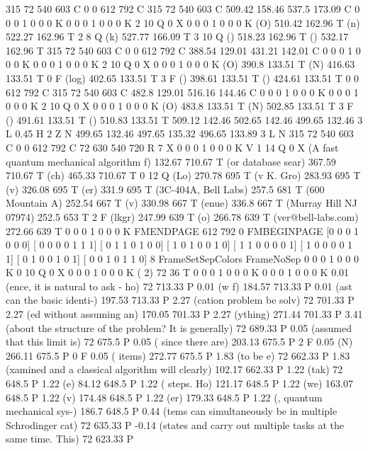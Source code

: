 315 72 540 603 C
0 0 612 792 C
315 72 540 603 C
509.42 158.46 537.5 173.09 C
0 0 0 1 0 0 0 K
0 0 0 1 0 0 0 K
2 10 Q
0 X
0 0 0 1 0 0 0 K
(O) 510.42 162.96 T
(n) 522.27 162.96 T
2 8 Q
(k) 527.77 166.09 T
3 10 Q
() 518.23 162.96 T
() 532.17 162.96 T
315 72 540 603 C
0 0 612 792 C
388.54 129.01 431.21 142.01 C
0 0 0 1 0 0 0 K
0 0 0 1 0 0 0 K
2 10 Q
0 X
0 0 0 1 0 0 0 K
(O) 390.8 133.51 T
(N) 416.63 133.51 T
0 F
(log) 402.65 133.51 T
3 F
() 398.61 133.51 T
() 424.61 133.51 T
0 0 612 792 C
315 72 540 603 C
482.8 129.01 516.16 144.46 C
0 0 0 1 0 0 0 K
0 0 0 1 0 0 0 K
2 10 Q
0 X
0 0 0 1 0 0 0 K
(O) 483.8 133.51 T
(N) 502.85 133.51 T
3 F
() 491.61 133.51 T
() 510.83 133.51 T
509.12 142.46 502.65 142.46 499.65 132.46 3 L
0.45 H
2 Z
N
499.65 132.46 497.65 135.32 496.65 133.89 3 L
N
315 72 540 603 C
0 0 612 792 C
72 630 540 720 R
7 X
0 0 0 1 0 0 0 K
V
1 14 Q
0 X
(A fast quantum mechanical algorithm f) 132.67 710.67 T
(or database sear) 367.59 710.67 T
(ch) 465.33 710.67 T
0 12 Q
(Lo) 270.78 695 T
(v K. Gro) 283.93 695 T
(v) 326.08 695 T
(er) 331.9 695 T
(3C-404A, Bell Labs) 257.5 681 T
(600 Mountain A) 252.54 667 T
(v) 330.98 667 T
(enue) 336.8 667 T
(Murray Hill NJ 07974) 252.5 653 T
2 F
(lkgr) 247.99 639 T
(o) 266.78 639 T
(ver@bell-labs.com) 272.66 639 T
0 0 0 1 0 0 0 K
FMENDPAGE
612 792 0 FMBEGINPAGE
[0 0 0 1 0 0 0]
[ 0 0 0 0 1 1 1]
[ 0 1 1 0 1 0 0]
[ 1 0 1 0 0 1 0]
[ 1 1 0 0 0 0 1]
[ 1 0 0 0 0 1 1]
[ 0 1 0 0 1 0 1]
[ 0 0 1 0 1 1 0]
 8 FrameSetSepColors
FrameNoSep
0 0 0 1 0 0 0 K
0 10 Q
0 X
0 0 0 1 0 0 0 K
(                                                                                        2) 72 36 T
0 0 0 1 0 0 0 K
0 0 0 1 0 0 0 K
0.01 (ence, it is natural to ask - ho) 72 713.33 P
0.01 (w f) 184.57 713.33 P
0.01 (ast can the basic identi-) 197.53 713.33 P
2.27 (cation problem be solv) 72 701.33 P
2.27 (ed without assuming an) 170.05 701.33 P
2.27 (ything) 271.44 701.33 P
3.41 (about the structure of the problem? It is generally) 72 689.33 P
0.05 (assumed that this limit is) 72 675.5 P
0.05 ( since there are) 203.13 675.5 P
2 F
0.05 (N) 266.11 675.5 P
0 F
0.05 ( items) 272.77 675.5 P
1.83 (to be e) 72 662.33 P
1.83 (xamined and a classical algorithm will clearly) 102.17 662.33 P
1.22 (tak) 72 648.5 P
1.22 (e) 84.12 648.5 P
1.22 ( steps. Ho) 121.17 648.5 P
1.22 (we) 163.07 648.5 P
1.22 (v) 174.48 648.5 P
1.22 (er) 179.33 648.5 P
1.22 (, quantum mechanical sys-) 186.7 648.5 P
0.44 (tems can simultaneously be in multiple Schrodinger cat) 72 635.33 P
-0.14 (states and carry out multiple tasks at the same time. This) 72 623.33 P
